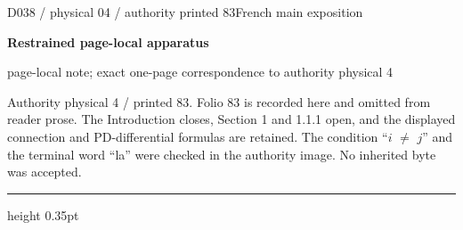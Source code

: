 \documentclass[9pt]{article}
\newcommand{\CanonText}[1]{\par{\fontsize{8.0}{9.35}\selectfont\RaggedRight #1\par}\vspace{2.2pt}}
\newcommand{\LayerTitle}{Restrained page-local apparatus}
\begin{document}
\noindent\begin{minipage}[t][\dimexpr\textheight-5pt\relax][t]{\textwidth}
{\sffamily\fontsize{7.3}{8.2}\selectfont\color{Quiet} D038 / physical 04 / authority printed 83\hfill French main exposition}
\par{}\vspace{4.5pt}
{\sffamily\fontsize{10.4}{11.6}\selectfont\bfseries\color{Accent} \LayerTitle}
\par{\sffamily\fontsize{6.7}{7.7}\selectfont\color{Quiet} page-local note; exact one-page correspondence to authority physical 4}
\vspace{5pt}
\CanonText{Authority physical 4 / printed 83. Folio 83 is recorded here and omitted from reader prose. The Introduction closes, Section 1 and 1.1.1 open, and the displayed connection and PD-differential formulas are retained. The condition “\(i\) \(\neq{}\) \(j\)” and the terminal word “la” were checked in the authority image. No inherited byte was accepted.}
\vfill
{\color{Accent}\hrule height 0.35pt}\vspace{3pt}
\end{minipage}
\newpage
\end{document}
